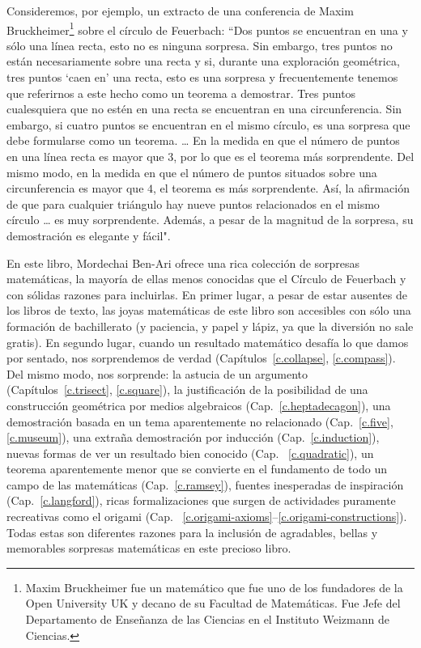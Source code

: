 Consideremos, por ejemplo, un extracto de una conferencia de Maxim Bruckheimer\footnote{Maxim Bruckheimer fue un matemático que fue uno de los fundadores de la Open University UK y decano de su Facultad de Matemáticas. Fue Jefe del Departamento de Enseñanza de las Ciencias en el Instituto Weizmann de Ciencias.} sobre el círculo de Feuerbach: ``Dos puntos se encuentran en una y sólo una línea recta, esto no es ninguna sorpresa. Sin embargo, tres puntos no están necesariamente sobre una recta y si, durante una exploración geométrica, tres puntos `caen en' una recta, esto es una sorpresa y frecuentemente tenemos que referirnos a este hecho como un teorema a demostrar. Tres puntos cualesquiera que no estén en una recta se encuentran en una circunferencia. Sin embargo, si cuatro puntos se encuentran en el mismo círculo, es una sorpresa que debe formularse como un teorema. \ldots{} En la medida en que el número de puntos en una línea recta es mayor que $3$, por lo que es el teorema más sorprendente. Del mismo modo, en la medida en que el número de puntos situados sobre una circunferencia es mayor que $4$, el teorema es más sorprendente. Así, la afirmación de que para cualquier triángulo hay nueve puntos relacionados en el mismo círculo \ldots{} es muy sorprendente. Además, a pesar de la magnitud de la sorpresa, su demostración es elegante y fácil".

En este libro, Mordechai Ben-Ari ofrece una rica colección de sorpresas matemáticas, la mayoría de ellas menos conocidas que el Círculo de Feuerbach y con sólidas razones para incluirlas. En primer lugar, a pesar de estar ausentes de los libros de texto, las joyas matemáticas de este libro son accesibles con sólo una formación de bachillerato (y paciencia, y papel y lápiz, ya que la diversión no sale gratis). En segundo lugar, cuando un resultado matemático desafía lo que damos por sentado, nos sorprendemos de verdad (Capítulos~\ref{c.collapse}, \ref{c.compass}). Del mismo modo, nos sorprende: la astucia de un argumento (Capítulos~\ref{c.trisect}, \ref{c.square}), la justificación de la posibilidad de una construcción geométrica por medios algebraicos (Cap.~\ref{c.heptadecagon}), una demostración basada en un tema aparentemente no relacionado (Cap.~\ref{c.five}, \ref{c.museum}), una extraña demostración por inducción (Cap.~\ref{c.induction}), nuevas formas de ver un resultado bien conocido (Cap. ~\ref{c.quadratic}), un teorema aparentemente menor que se convierte en el fundamento de todo un campo de las matemáticas (Cap.~\ref{c.ramsey}), fuentes inesperadas de inspiración (Cap.~\ref{c.langford}), ricas formalizaciones que surgen de actividades puramente recreativas como el origami (Cap. ~\ref{c.origami-axioms}--\ref{c.origami-constructions}). Todas estas son diferentes razones para la inclusión de agradables, bellas y memorables sorpresas matemáticas en este precioso libro.
   
